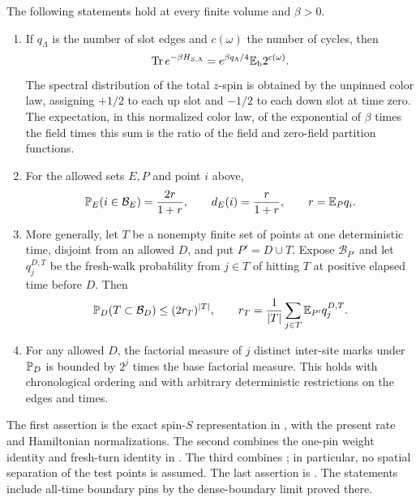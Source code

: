 \begin{proposition}\label{prop:loopinputs}
The following statements hold at every finite volume and $\beta>0$.
\begin{enumerate}
\item If $q_\Lambda$ is the number of slot edges and $c(\omega)$ the
number of cycles, then
\[
 \operatorname{Tr} e^{-\beta H_{S,\Lambda}}
       =e^{\beta q_\Lambda/4}\mathbb E_{\mathrm b}2^{c(\omega)}.
\]
The spectral distribution of the total $z$-spin is obtained by the
unpinned color law, assigning $+1/2$ to each up slot and $-1/2$ to each
down slot at time zero.  The expectation, in this normalized color law,
of the exponential of $\beta$ times the field times this sum is the
ratio of the field and zero-field partition functions.
\item For the allowed sets $E,P$ and point $i$ above,
\begin{equation}\label{eq:pinreturn}
 \mathbb P_E(i\in\mathcal B_E)=\frac{2r}{1+r},
 \qquad d_E(i)=\frac{r}{1+r},\qquad r=\mathbb E_Pq_i.
\end{equation}
\item More generally, let $T$ be a nonempty finite set of points at one
deterministic time, disjoint from an allowed $D$, and put $P'=D\cup T$.
Expose $\mathcal B_{P'}$ and let $q_j^{D,T}$ be the fresh-walk probability
from $j\in T$ of hitting $T$ at positive elapsed time before $D$.  Then
\begin{equation}\label{eq:simultaneouspin}
 \mathbb P_D(T\subset\mathcal B_D)\le (2r_T)^{|T|},
 \qquad
 r_T=\frac1{|T|}\sum_{j\in T}\mathbb E_{P'}q_j^{D,T}.
\end{equation}
\item For any allowed $D$, the factorial measure of $j$ distinct
inter-site marks under $\mathbb P_D$ is bounded by $2^j$ times the base
factorial measure.  This holds with chronological ordering and with
arbitrary deterministic restrictions on the edges and times.
\end{enumerate}
\end{proposition}

The first assertion is the exact spin-$S$ representation in
\cite[Proposition~2.2]{Ordering}, with the present rate and Hamiltonian
normalizations.  The second combines the one-pin weight identity and
fresh-turn identity in \cite[Propositions~2.4 and~2.8]{BlochLaw}.
The third combines \cite[Proposition~3.1 and Lemma~4.4]{Ordering}; in
particular, no spatial separation of the test points is assumed.
The last assertion is \cite[Lemma~2.4]{Ordering}.  The statements include
all-time boundary pins by the dense-boundary limit proved there.

